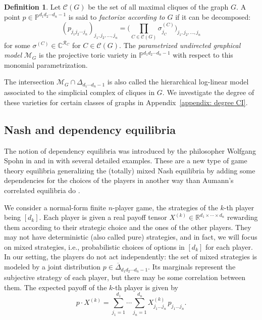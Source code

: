\documentclass[11pt]{amsart}
\numberwithin{equation}{section}
\theoremstyle{plain}
\numberwithin{theorem}{section}
\theoremstyle{definition}
\newtheorem{definition}[theorem]{Definition}
\begin{document}
\begin{definition}\label{def: parametrized CI model}
   Let $\mathcal C(G)$ be the set of all maximal cliques of the graph $G$. A point $p\in\mathbb P^{d_1 d_2 \cdots d_n-1}$ is said to \textit{factorize according to $G$} if it can be decomposed: $$(p_{j_1 j_2\cdots j_n})_{j_1,j_2,\ldots,j_n}=\bigg(\prod_{C\in \mathcal C(G)}\sigma^{(C)}_{j_C}\bigg)_{j_1,j_2,\ldots,j_n}$$ for some $\sigma^{(C)}\in\mathbb C^{\mathcal R_C}$ for $C\in \mathcal C(G)$. The \textit{parametrized undirected graphical model} $\mathcal M_G$ is the projective toric variety in $\mathbb P^{d_1 d_2 \cdots d_n-1}$ with respect to this monomial parametrization. 
\end{definition}
The intersection $\mathcal M_G\cap\Delta_{d_1 \cdots d_n -1}$ is also called the hierarchical log-linear model associated to the simplicial complex of cliques in $G$. We investigate the degree of these varieties for certain classes of graphs in Appendix~\ref{appendix: degree CI}.


\subsection{Nash and dependency equilibria}

The notion of dependency equilibria was introduced by the philosopher Wolfgang Spohn in \cite{spohn2003dependency} and in \cite{spohn2007dependency} with several detailed examples. These are a new type of game theory equilibria generalizing the (totally) mixed Nash equilibria by adding some dependencies for the choices of the players in another way than Aumann's correlated equilibria do \cite{aumann1974subjectivity, brandenburg2025combinatorics}.

We consider a normal-form finite $n$-player game, the strategies of the $k$-th player being $[d_k]$. Each player is given a real payoff tensor $X^{(k)}\in\mathbb R^{d_1 \times \cdots \times d_n}$ rewarding them according to their strategic choice and the ones of the other players. They may not have deterministic (also called pure) strategies, and in fact, we will focus on mixed strategies, i.e., probabilistic choices of options in $[d_k]$ for each player. In our setting, the players do not act independently: the set of mixed strategies is modeled by a joint distribution $p \in \overline\Delta_{d_1 d_2\cdots d_n-1}$. Its marginals represent the subjective strategy of each player, but there may be some correlation between them. The expected payoff of the $k$-th player is given by
\[
p \cdot X^{(k)} = 
\sum_{j_1 = 1}^{d_1} \cdots \sum_{j_n = 1}^{d_n}
X^{(k)}_{j_1 \dots j_n}\, p_{j_1 \dots j_n}.
\]
\end{document}
